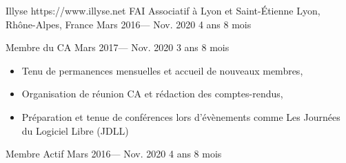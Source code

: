 \volunteerorganization%
{Illyse}%
{https://www.illyse.net}%
{FAI Associatif à Lyon et Saint-Étienne}%
{Lyon, Rhône-Alpes, France}%
{Mars 2016--- Nov. 2020}
{4 ans 8 mois}

\volunteerposition%
{Membre du CA}%
{Mars 2017--- Nov. 2020}%
{3 ans 8 mois}%
{
	\begin{itemize}
		\item Tenu de permanences mensuelles et accueil de nouveaux membres,
		\item Organisation de réunion CA et rédaction des comptes-rendus,
		\item Préparation et tenue de conférences lors d’évènements comme Les Journées du Logiciel Libre (JDLL)
	\end{itemize}
}

\volunteerposition%
{Membre Actif}%
{Mars 2016--- Nov. 2020}
{4 ans 8 mois}
{}
